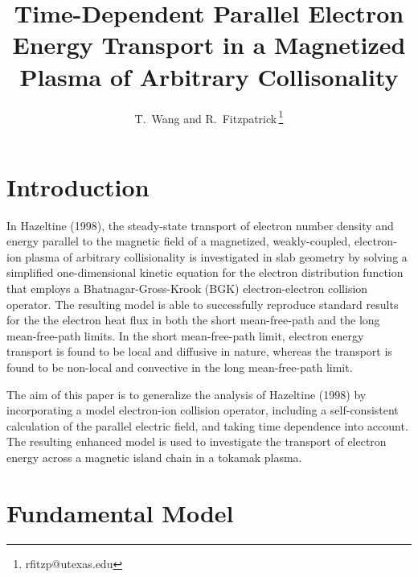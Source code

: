 \documentclass[12pt,prb,aps]{revtex4-1}
\begin{document}
\title{Time-Dependent Parallel Electron Energy Transport in  a Magnetized Plasma of Arbitrary Collisonality}
\author{T.~Wang and R.~Fitzpatrick\,\footnote{rfitzp@utexas.edu}}
\maketitle

\section{Introduction}
In Hazeltine (1998),\cite{haz}  the steady-state transport of electron number density and energy parallel to the magnetic field
of a magnetized, weakly-coupled, electron-ion plasma of arbitrary collisionality is investigated  in slab geometry   by solving a simplified one-dimensional kinetic equation for the electron distribution function that employs a Bhatnagar-Gross-Krook (BGK)  electron-electron collision
operator.\cite{krook}  The resulting model is able to successfully reproduce standard results for the the electron heat flux in both the short mean-free-path and
the long mean-free-path limits. In the short mean-free-path limit, electron energy transport is found to be local and diffusive in nature, whereas the transport is found to be non-local and convective in the
long mean-free-path limit. 

The aim of this paper is to generalize the analysis of Hazeltine (1998) by  incorporating a model electron-ion collision operator,
 including a self-consistent calculation of the parallel electric field, and taking time dependence into account. The resulting enhanced model is used to investigate the transport of electron
 energy across a magnetic island chain in a tokamak plasma. 

\section{Fundamental Model}\label{s2}
\end{document}
